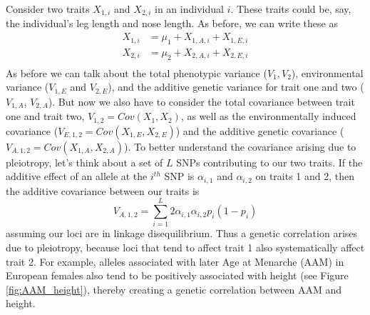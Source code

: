 Consider two traits $X_{1,i}$ and $X_{2,i}$ in an individual $i$. These traits could be,
say, the individual's leg length and nose length. As before, we can write
these as 
\begin{eqnarray}
X_{1,i} &= \mu_1+ X_{1,A,i} + X_{1,E,i}  \nonumber \\
X_{2,i} &= \mu_2 +X_{2,A,i} + X_{2,E,i} \nonumber \\
\end{eqnarray}
As before we can talk about the total phenotypic variance ($V_1,V_2$),
environmental variance  ($V_{1,E}$ and $V_{2,E}$), and the additive genetic variance for trait one and two ($V_{1,A}$, $V_{2,A}$). But now we also have to consider the 
total covariance between trait one and trait two, $V_{1,2}=Cov(X_{1},X_{2})$, as well as the environmentally induced covariance ($V_{E,1,2}=Cov(X_{1,E}
,X_{2,E} )$) and the additive genetic covariance ($V_{A,1,2}
=Cov(X_{1,A} ,X_{2,A} )$). To better understand the covariance arising due to pleiotropy, let's think about a set of $L$ SNPs contributing to our two traits. If the additive effect of an allele at the $i^{th}$ SNP is $\alpha_{i,1}$ and $\alpha_{i,2}$ on traits 1 and 2, then the additive covariance between our traits is
\begin{equation}
V_{A,1,2} = \sum_{i=1}^L 2\alpha_{i,1}\alpha_{i,2} p_i(1-p_i)
\end{equation}
assuming our loci are in linkage disequilibrium. Thus a genetic correlation arises due to pleiotropy, because loci that tend to affect trait 1 also systematically affect trait 2. For example, alleles associated with later Age at Menarche (AAM) in European females also tend to be positively associated with height (see Figure \ref{fig:AAM_height}), thereby creating a genetic correlation between AAM and height. 


